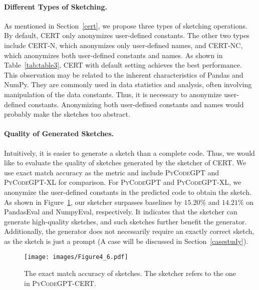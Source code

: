 \documentclass{article}
\newcommand{\cert}{\textsc{CERT}\xspace}
\newcommand{\peval}{PandasEval\xspace}
\newcommand{\neval}{NumpyEval\xspace}
\newcommand{\codepy}{\textsc{PyCodeGPT}\xspace}
\newcommand{\codepyxl}{\textsc{PyCodeGPT}-XL\xspace}
\newcommand{\pandas}{Pandas\xspace}
\newcommand{\numpy}{NumPy\xspace}
\begin{document}
\paragraph{Different Types of Sketching.}
As mentioned in Section~\ref{cert}, we propose three types of sketching operations. By default, \cert only anonymizes user-defined constants. The other two types include \cert-N, which anonymizes only user-defined names, and \cert-NC, which anonymizes both user-defined constants and names. As shown in Table~\ref{tab:table3}, \cert with default setting achieves the best performance. This observation may be related to the inherent characteristics of \pandas and \numpy. They are commonly used in data statistics and analysis, often involving manipulation of the data constants. Thus, it is necessary to anonymize user-defined constants. Anonymizing both user-defined constants and names would probably make the sketches too abstract.

\paragraph{Quality of Generated Sketches.}
Intuitively, it is easier to generate a sketch than a complete code. Thus, we would like to evaluate the quality of sketches generated by the sketcher of \cert. We use exact match accuracy as the metric and include \codepy and \codepyxl for comparison. For \codepy and \codepyxl, we anonymize the user-defined constants in the predicted code to obtain the sketch. As shown in Figure~\ref{fig:figure4}, our sketcher surpasses baselines by $15.20\%$ and $14.21\%$ on \peval and \neval, respectively. It indicates that the sketcher can generate high-quality sketches, and such sketches further benefit the generator. Additionally, the generator does not necessarily require an exactly correct sketch, as the sketch is just a prompt (A case will be discussed in Section~\ref{casestudy}). 

\begin{figure}[t]
    \small
    \centering
    \texttt{[image: images/Figure4\_6.pdf]}
\caption{The exact match accuracy of sketches. The sketcher refers to the one in \codepy-\cert.
    }
    \label{fig:figure4}
\end{figure}
\end{document}
